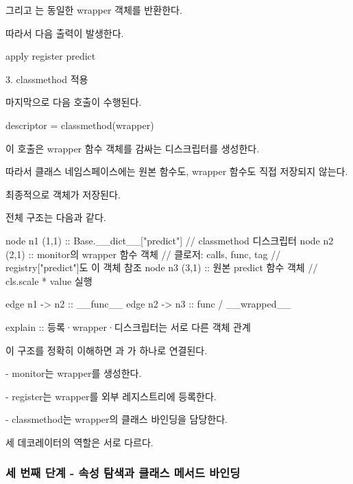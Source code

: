 그리고 는 동일한 wrapper 객체를 반환한다.

따라서 다음 출력이 발생한다.

\begin{dhkzsh}
apply register predict
\end{dhkzsh}

\begin{dhknote}
\begin{dhksmry}[centered]
3. classmethod 적용
\end{dhksmry}
\end{dhknote}

마지막으로 다음 호출이 수행된다.

\begin{dhkcode}
descriptor = classmethod(wrapper)
\end{dhkcode}

이 호출은 wrapper 함수 객체를 감싸는  디스크립터를 생성한다.

따라서  클래스 네임스페이스에는 원본 함수도, wrapper 함수도 직접 저장되지 않는다.

최종적으로  객체가 저장된다.

전체 구조는 다음과 같다.

\begin{dhkgraph}[uniform]
node n1 (1,1) :: Base.__dict__["predict"] // classmethod 디스크립터
node n2 (2,1) :: monitor의 wrapper 함수 객체 // 클로저: calls, func, tag // registry["predict"]도 이 객체 참조
node n3 (3,1) :: 원본 predict 함수 객체 // cls.scale * value 실행

edge n1 -> n2 :: __func__
edge n2 -> n3 :: func / __wrapped__

explain :: 등록·wrapper·디스크립터는 서로 다른 객체 관계
\end{dhkgraph}

이 구조를 정확히 이해하면 과 가 하나로 연결된다.

\begin{dhksmry}
    - monitor는 wrapper를 생성한다.

    - register는 wrapper를 외부 레지스트리에 등록한다.

    - classmethod는 wrapper의 클래스 바인딩을 담당한다.
\end{dhksmry}

세 데코레이터의 역할은 서로 다르다.

\subsubsection{세 번째 단계 - 속성 탐색과 클래스 메서드 바인딩}

